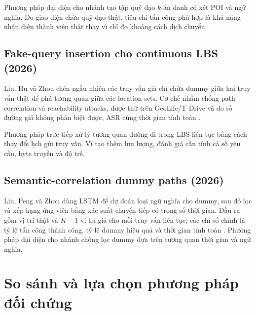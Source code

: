 \documentclass[12pt,a4paper,oneside]{report}
\begin{document}
Phương pháp đại diện cho nhánh tạo tập quỹ đạo $k$-ẩn danh có xét POI và ngữ nghĩa. Do giao diện chứa quỹ đạo thật, tiêu chí tấn công phù hợp là khả năng nhận diện thành viên thật thay vì chỉ đo khoảng cách dịch chuyển.

\subsection{Fake-query insertion cho continuous LBS (2026)}

Liu, Hu và Zhou chèn ngẫu nhiên các truy vấn giả chỉ chứa dummy giữa hai truy vấn thật để phá tương quan giữa các location sets. Cơ chế nhằm chống path-correlation và reachability attacks, được thử trên GeoLife/T-Drive và đo số đường giả không phân biệt được, ASR cùng thời gian tính toán \citep{liu2026fakequeries}.

Phương pháp trực tiếp xử lý tương quan đường đi trong LBS liên tục bằng cách thay đổi lịch gửi truy vấn. Vì tạo thêm lưu lượng, đánh giá cần tính cả số yêu cầu, byte truyền và độ trễ.

\subsection{Semantic-correlation dummy paths (2026)}

Liu, Peng và Zhou dùng LSTM để dự đoán loại ngữ nghĩa cho dummy, sau đó lọc và xếp hạng ứng viên bằng xác suất chuyển tiếp có trọng số thời gian. Đầu ra gồm vị trí thật và $K-1$ vị trí giả cho mỗi truy vấn liên tục; các chỉ số chính là tỷ lệ tấn công thành công, tỷ lệ dummy hiệu quả và thời gian tính toán \citep{liu2026semantic}. Phương pháp đại diện cho nhánh chống lọc dummy dựa trên tương quan thời gian và ngữ nghĩa.

\section{So sánh và lựa chọn phương pháp đối chứng}
\end{document}
